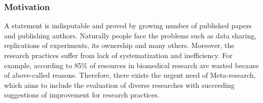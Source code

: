 		\subsubsection{Motivation}
		A statement \frqq is indisputable and proved by growing number of published papers and publishing authors\cite{Ioa14}. Naturally people face the problems such as data sharing, replications of experiments, its ownership and many others. Moreover, the research practices suffer from lack of systematization and inefficiency. For example, according to \cite{Mac14}  85\% of resources in biomedical research are wasted because of above-called reasons. Therefore, there exists the urgent need of Meta-research, which aims to include the evaluation of diverse researches with succeeding suggestions of improvement for research practices.    
		
		 
